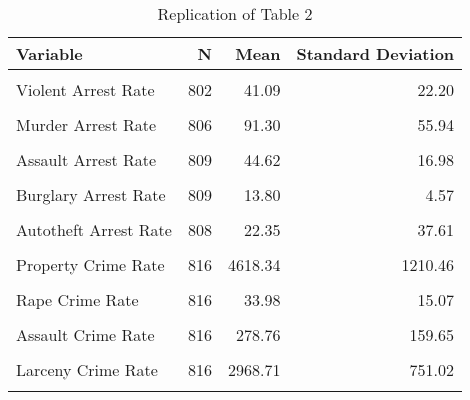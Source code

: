 \begin{table}[H]

\caption{\label{tab:tab:replicatetable2}Replication of Table 2}
\centering
\begin{tabular}[t]{lrrr}
\toprule
Variable & N & Mean & Standard Deviation\\
\midrule
\cellcolor{gray!6}{Shalll} & \cellcolor{gray!6}{816} & \cellcolor{gray!6}{0.19} & \cellcolor{gray!6}{0.39}\\
Violent Arrest Rate & 802 & 41.09 & 22.20\\
\cellcolor{gray!6}{Property Arrest Rate} & \cellcolor{gray!6}{809} & \cellcolor{gray!6}{16.92} & \cellcolor{gray!6}{4.68}\\
Murder Arrest Rate & 806 & 91.30 & 55.94\\
\cellcolor{gray!6}{Rape Arrest Rate} & \cellcolor{gray!6}{799} & \cellcolor{gray!6}{41.02} & \cellcolor{gray!6}{17.39}\\
\addlinespace
Assault Arrest Rate & 809 & 44.62 & 16.98\\
\cellcolor{gray!6}{Robery Arrest Rate} & \cellcolor{gray!6}{808} & \cellcolor{gray!6}{31.46} & \cellcolor{gray!6}{13.59}\\
Burglary Arrest Rate & 809 & 13.80 & 4.57\\
\cellcolor{gray!6}{Larceny Arrest Rate} & \cellcolor{gray!6}{809} & \cellcolor{gray!6}{18.54} & \cellcolor{gray!6}{5.20}\\
Autotheft Arrest Rate & 808 & 22.35 & 37.61\\
\addlinespace
\cellcolor{gray!6}{Violent Crime Rate} & \cellcolor{gray!6}{816} & \cellcolor{gray!6}{483.93} & \cellcolor{gray!6}{318.94}\\
Property Crime Rate & 816 & 4618.34 & 1210.46\\
\cellcolor{gray!6}{Murder Crime Rate} & \cellcolor{gray!6}{816} & \cellcolor{gray!6}{7.77} & \cellcolor{gray!6}{6.88}\\
Rape Crime Rate & 816 & 33.98 & 15.07\\
\cellcolor{gray!6}{Robbery Crime Rate} & \cellcolor{gray!6}{816} & \cellcolor{gray!6}{163.42} & \cellcolor{gray!6}{176.25}\\
\addlinespace
Assault Crime Rate & 816 & 278.76 & 159.65\\
\cellcolor{gray!6}{Burglary Crime Rate} & \cellcolor{gray!6}{816} & \cellcolor{gray!6}{1239.34} & \cellcolor{gray!6}{417.76}\\
Larceny Crime Rate & 816 & 2968.71 & 751.02\\
\cellcolor{gray!6}{Autotheft Crime Rate} & \cellcolor{gray!6}{816} & \cellcolor{gray!6}{410.30} & \cellcolor{gray!6}{231.15}\\

\end{tabular}
\end{table}
